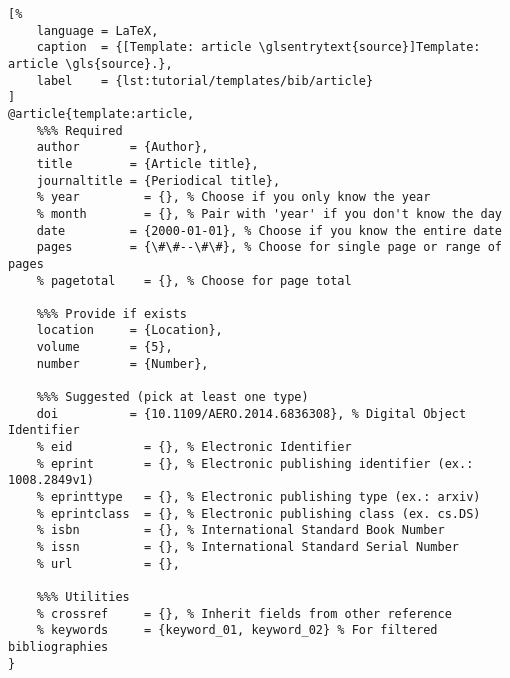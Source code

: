 \begin{lstlisting}[%
    language = LaTeX,
    caption  = {[Template: article \glsentrytext{source}]Template: article \gls{source}.},
    label    = {lst:tutorial/templates/bib/article}
]
@article{template:article,
    %%% Required
    author       = {Author},
    title        = {Article title},
    journaltitle = {Periodical title},
    % year         = {}, % Choose if you only know the year
    % month        = {}, % Pair with 'year' if you don't know the day
    date         = {2000-01-01}, % Choose if you know the entire date
    pages        = {\#\#--\#\#}, % Choose for single page or range of pages
    % pagetotal    = {}, % Choose for page total
    
    %%% Provide if exists
    location     = {Location},
    volume       = {5},
    number       = {Number},
    
    %%% Suggested (pick at least one type)
    doi          = {10.1109/AERO.2014.6836308}, % Digital Object Identifier
    % eid          = {}, % Electronic Identifier
    % eprint       = {}, % Electronic publishing identifier (ex.: 1008.2849v1)
    % eprinttype   = {}, % Electronic publishing type (ex.: arxiv)
    % eprintclass  = {}, % Electronic publishing class (ex. cs.DS)
    % isbn         = {}, % International Standard Book Number
    % issn         = {}, % International Standard Serial Number
    % url          = {},
    
    %%% Utilities
    % crossref     = {}, % Inherit fields from other reference
    % keywords     = {keyword_01, keyword_02} % For filtered bibliographies
}
\end{lstlisting}

